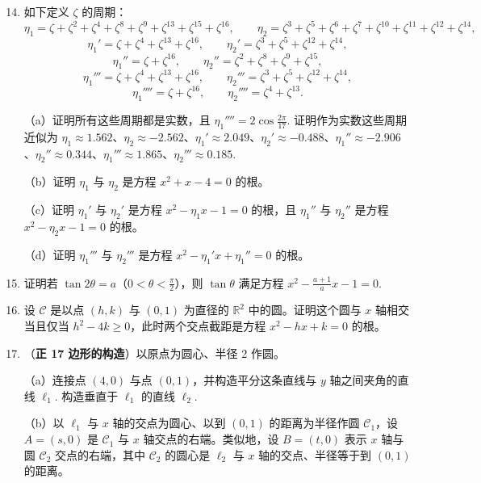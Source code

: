 \begin{enumerate}
\setcounter{enumi}{13}
\item 如下定义 \(\zeta\) 的周期：
\[
\eta_1 = \zeta+\zeta^2+\zeta^4+\zeta^8+\zeta^9+\zeta^{13}+\zeta^{15}+\zeta^{16}, \qquad \eta_2 = \zeta^3+\zeta^5+\zeta^6+\zeta^7+\zeta^{10}+\zeta^{11}+\zeta^{12}+\zeta^{14},
\]
\[
\eta_1' = \zeta+\zeta^4+\zeta^{13}+\zeta^{16}, \qquad \eta_2' = \zeta^3+\zeta^5+\zeta^{12}+\zeta^{14},
\]
\[
\eta_1'' = \zeta+\zeta^{16}, \qquad \eta_2'' = \zeta^2+\zeta^8+\zeta^9+\zeta^{15},
\]
\[
\eta_1''' = \zeta+\zeta^4+\zeta^{13}+\zeta^{16}, \qquad \eta_2''' = \zeta^3+\zeta^5+\zeta^{12}+\zeta^{14},
\]
\[
\eta_1'''' = \zeta+\zeta^{16}, \qquad \eta_2'''' = \zeta^4+\zeta^{13}.
\]

（a）证明所有这些周期都是实数，且 \(\eta_1'''' = 2\cos\frac{2\pi}{17}\). 证明作为实数这些周期近似为 \(\eta_1 \approx 1.562\)、\(\eta_2 \approx -2.562\)、\(\eta_1' \approx 2.049\)、\(\eta_2' \approx -0.488\)、\(\eta_1'' \approx -2.906\)、\(\eta_2'' \approx 0.344\)、\(\eta_1''' \approx 1.865\)、\(\eta_2''' \approx 0.185\).

（b）证明 \(\eta_1\) 与 \(\eta_2\) 是方程 \(x^2+x-4 = 0\) 的根。

（c）证明 \(\eta_1'\) 与 \(\eta_2'\) 是方程 \(x^2-\eta_1x-1 = 0\) 的根，且 \(\eta_1''\) 与 \(\eta_2''\) 是方程 \(x^2-\eta_2x-1 = 0\) 的根。

（d）证明 \(\eta_1'''\) 与 \(\eta_2'''\) 是方程 \(x^2-\eta_1'x+\eta_1'' = 0\) 的根。

\item 证明若 \(\tan 2\theta = a\)（\(0 < \theta < \frac{\pi}{2}\)），则 \(\tan\theta\) 满足方程 \(x^2-\frac{a+1}{a}x-1 = 0\).

\item 设 \(\mathcal{C}\) 是以点 \((h, k)\) 与 \((0, 1)\) 为直径的 \(\mathbb{R}^2\) 中的圆。证明这个圆与 \(x\) 轴相交当且仅当 \(h^2-4k \geq 0\)，此时两个交点截距是方程 \(x^2-hx+k = 0\) 的根。

\item （\textbf{正 17 边形的构造}）以原点为圆心、半径 2 作圆。

（a）连接点 \((4, 0)\) 与点 \((0, 1)\)，并构造平分这条直线与 \(y\) 轴之间夹角的直线 \(\ell_1\). 构造垂直于 \(\ell_1\) 的直线 \(\ell_2\).

（b）以 \(\ell_1\) 与 \(x\) 轴的交点为圆心、以到 \((0, 1)\) 的距离为半径作圆 \(\mathcal{C}_1\)，设 \(A = (s, 0)\) 是 \(\mathcal{C}_1\) 与 \(x\) 轴交点的右端。类似地，设 \(B = (t, 0)\) 表示 \(x\) 轴与圆 \(\mathcal{C}_2\) 交点的右端，其中 \(\mathcal{C}_2\) 的圆心是 \(\ell_2\) 与 \(x\) 轴的交点、半径等于到 \((0, 1)\) 的距离。


\end{enumerate}
